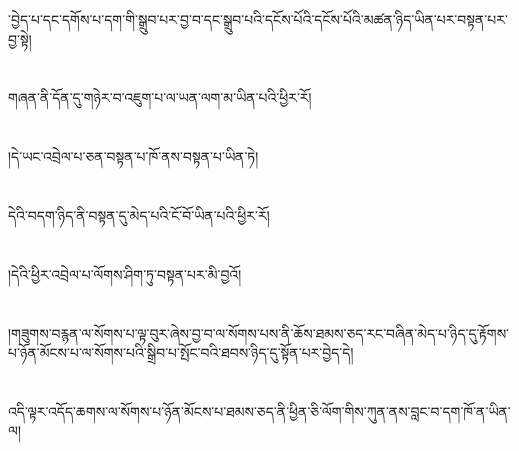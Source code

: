 ་བྱེད་པ་དང་དགོས་པ་དག་གི་སྒྲུབ་པར་བྱ་བ་དང་སྒྲུབ་པའི་དངོས་པོའི་དངོས་པོའི་མཚན་ཉིད་ཡིན་པར་བསྟན་པར་བྱ་སྟེ།\chapter{ }གཞན་ནི་དོན་དུ་གཉེར་བ་འཇུག་པ་ལ་ཡན་ལག་མ་ཡིན་པའི་ཕྱིར་རོ།\chapter{ }།དེ་ཡང་འབྲེལ་པ་ཅན་བསྟན་པ་ཁོ་ནས་བསྟན་པ་ཡིན་ཏེ།\chapter{ }དེའི་བདག་ཉིད་ནི་བསྟན་དུ་མེད་པའི་ངོ་བོ་ཡིན་པའི་ཕྱིར་རོ།\chapter{ }།དེའི་ཕྱིར་འབྲེལ་པ་ལོགས་ཤིག་ཏུ་བསྟན་པར་མི་བྱའོ།\chapter{ }།གཟུགས་བརྙན་ལ་སོགས་པ་ལྟ་བུར་ཞེས་བྱ་བ་ལ་སོགས་པས་ནི་ཆོས་ཐམས་ཅད་རང་བཞིན་མེད་པ་ཉིད་དུ་རྟོགས་པ་ཉོན་མོངས་པ་ལ་སོགས་པའི་སྒྲིབ་པ་སྤོང་བའི་ཐབས་ཉིད་དུ་སྟོན་པར་བྱེད་དེ།\chapter{ }འདི་ལྟར་འདོད་ཆགས་ལ་སོགས་པ་ཉོན་མོངས་པ་ཐམས་ཅད་ནི་ཕྱིན་ཅི་ལོག་གིས་ཀུན་ནས་བླང་བ་དག་ཁོ་ན་ཡིན་ལ།\ch